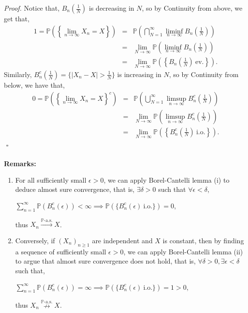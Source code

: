 \documentclass{article}
\begin{document}
\textit{Proof.} Notice that, $B_n(\frac{1}{N})$ is decreasing in $N$, so by Continuity from above, we get that,
\begin{eqnarray}
\nonumber
1 = \mathbb{P}\left(\left\{\lim_{n\to\infty}X_n = X\right\}\right) &=& \mathbb{P}\left(\bigcap_{N=1}^{\infty}\liminf_{n\to\infty}B_n\left(\frac{1}{N}\right)\right)\\
\nonumber
&=& \lim_{N\to\infty}\mathbb{P}\left(\liminf_{n\to\infty}B_n\left(\frac{1}{N}\right)\right)\\
\nonumber
&=& \lim_{N\to\infty}\mathbb{P}\left(\left\{B_{n}\left(\frac{1}{N}\right) \ \text{ev.}\right\}\right).
\end{eqnarray}
Similarly, $B_n^c(\frac{1}{N}) = \{|X_n - X| > \frac{1}{N}\}$ is increasing in $N$, so by Continuity from below, we have that,
\begin{eqnarray}
\nonumber
0 = \mathbb{P}\left(\left\{\lim_{n\to\infty}X_n = X\right\}^c\right) &=& \mathbb{P}\left(\bigcup_{N=1}^{\infty}\limsup_{n\to\infty}B_n^c\left(\frac{1}{N}\right)\right)\\
\nonumber
&=& \lim_{N\to\infty}\mathbb{P}\left(\limsup_{n\to\infty}B_n^c\left(\frac{1}{N}\right)\right)\\
\nonumber
&=& \lim_{N\to\infty}\mathbb{P}\left(\left\{B_{n}^c\left(\frac{1}{N}\right) \ \text{i.o.}\right\}\right).
\end{eqnarray}
${}$ \hfill $\square$ \\\\
\textbf{Remarks:}
\begin{enumerate}
	\item For all sufficiently small $\epsilon > 0$, we can apply Borel-Cantelli lemma (i) to deduce almost sure convergence, that is, $\exists \delta>0$ such that $\forall \epsilon < \delta$,
	\begin{center}
		$\sum_{n=1}^{\infty}\mathbb{P}(B_n^c(\epsilon)) < \infty \implies \mathbb{P}(\{B_n^c(\epsilon) \ \text{i.o.}\}) = 0$,
	\end{center}
	thus $X_n \xrightarrow{\mathbb{P}\text{-a.s.}} X$.
	\item Conversely, if $(X_n)_{n\geq1}$ are independent and $X$ is constant, then by finding a sequence of sufficiently small $\epsilon > 0$, we can apply Borel-Cantelli lemma (ii) to argue that almost sure convergence does not hold, that is, $\forall \delta > 0, \exists \epsilon < \delta$ such that,
	\begin{center}
		$\sum_{n=1}^{\infty}\mathbb{P}(B_n^c(\epsilon)) = \infty \implies \mathbb{P}(\{B_n^c(\epsilon) \ \text{i.o.}\}) = 1 > 0$,
	\end{center}
	thus $X_n \overset{\mathrm{\mathbb{P}\text{-a.s.}}}{\nrightarrow} X$.
\end{enumerate}
\end{document}

